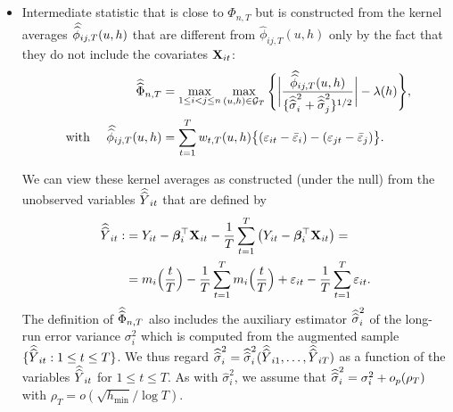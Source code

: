 \begin{itemize}
\item Intermediate statistic that is close to $\widehat{\Phi}_{n, T}$ but is constructed from the kernel averages $\doublehat{\phi}_{ij,T}(u,h)$ that are different from $\widehat{\phi}_{ij,T}(u,h)$ only by the fact that they do not include the covariates $\mathbf{X}_{it}$:
\begin{align*}
	\doublehattwo{\Phi}_{n,T} &= \max_{1 \le i < j \le n} \max_{(u,h) \in \mathcal{G}_T}\Bigg\{ \bigg| \frac{\doublehat{\phi}_{ij,T}(u,h)} {\{ \doublehattwo{\sigma}_i^2 + \doublehattwo{\sigma}_j^2 \}^{1/2}} \bigg| - \lambda(h)\Bigg\}, \\
   \text{ with  } \quad  	 \doublehat{\phi}_{ij,T}(u,h) &= \sum_{t=1}^T w_{t,T}(u,h) \big\{ (\varepsilon_{it} - \bar{\varepsilon}_i) - (\varepsilon_{jt} - \bar{\varepsilon}_j)  \big\}.\nonumber 
\end{align*}

We can view these kernel averages as constructed (under the null) from the unobserved variables $\widehat{\widehat{Y}}_{it}$ that are defined by 
\begin{align*}
\widehat{\widehat{Y}}_{it} :&= Y_{it} - \bm{\beta}_i^\top \mathbf{X}_{it} -  \frac{1}{T}\sum_{t=1}^T \big(Y_{it} - \bm{\beta}_i^\top \mathbf{X}_{it}\big) =\\
&=m_i \Big( \frac{t}{T} \Big)  - \frac{1}{T}\sum_{t=1}^T  m_i \Big( \frac{t}{T} \Big) + \varepsilon_{it} - \frac{1}{T}\sum_{t=1}^T \varepsilon_{it}.
\end{align*}
The definition of $\widehat{\widehat{\Phi}}_{n,T}$ also includes the auxiliary estimator $\widehat{\widehat{\sigma}}_i^2$ of the long-run error variance $\sigma_i^2$ which is computed from the augmented sample $\{ \widehat{\widehat{Y}}_{it}: 1 \le t \le T \}$. We thus regard $\widehat{\widehat{\sigma}}_i^2 = \widehat{\widehat{\sigma}}_i^2(\widehat{\widehat{Y}}_{i1},\ldots,\widehat{\widehat{Y}}_{iT})$ as a function of the variables $\widehat{\widehat{Y}}_{it}$ for $1 \le t \le T$. As with $\widehat{\sigma}_i^2$, we assume that $\widehat{\widehat{\sigma}}_i^2 = \sigma^2_i + o_p(\rho_T)$ with $\rho_T = o(\sqrt{h_{\min}}/\log T)$.




\end{itemize}
